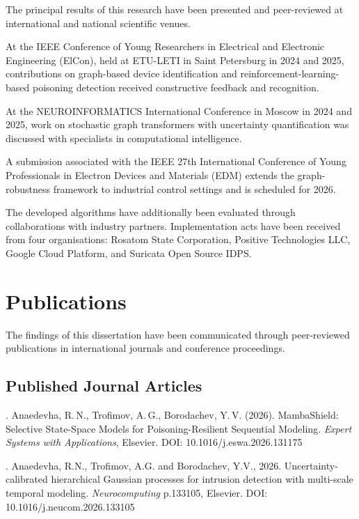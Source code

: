 The principal results of this research have been presented and peer-reviewed at international and national scientific venues.

At the IEEE Conference of Young Researchers in Electrical and Electronic Engineering (ElCon), held at ETU-LETI in Saint Petersburg in 2024 and 2025, contributions on graph-based device identification and reinforcement-learning-based poisoning detection received constructive feedback and recognition.

At the NEUROINFORMATICS International Conference in Moscow in 2024 and 2025, work on stochastic graph transformers with uncertainty quantification was discussed with specialists in computational intelligence.

A submission associated with the IEEE 27th International Conference of Young Professionals in Electron Devices and Materials (EDM) extends the graph-robustness framework to industrial control settings and is scheduled for 2026.

The developed algorithms have additionally been evaluated through collaborations with industry partners. Implementation acts have been received from four organisations: Rosatom State Corporation, Positive Technologies LLC, Google Cloud Platform, and Suricata Open Source IDPS.


\section*{Publications}

The findings of this dissertation have been communicated through peer-reviewed publications in international journals and conference proceedings.

\subsection*{Published Journal Articles}

. Anaedevha, R.\,N., Trofimov, A.\,G., Borodachev, Y.\,V. (2026). MambaShield: Selective State-Space Models for Poisoning-Resilient Sequential Modeling. \textit{Expert Systems with Applications}, Elsevier. DOI: 10.1016/j.eswa.2026.131175

. Anaedevha, R.N., Trofimov, A.G. and Borodachev, Y.V., 2026. Uncertainty-calibrated hierarchical Gaussian processes for intrusion detection with multi-scale temporal modeling. \textit{Neurocomputing} p.133105, Elsevier. DOI: 10.1016/j.neucom.2026.133105

